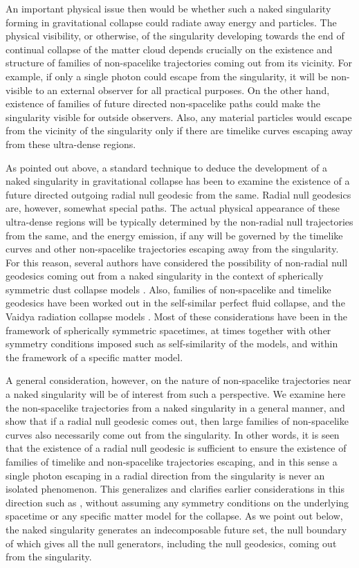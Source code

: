 \documentclass[twocolumn,aps,amsmath,amssymb,prl,showpacs,preprintnumbers]
{revtex4}
\begin{document}
An important physical issue then would be whether such a naked 
singularity forming in gravitational collapse could radiate away 
energy and particles. The physical visibility, or otherwise, of the 
singularity developing towards the end of continual collapse of the 
matter cloud depends crucially on the existence and structure of 
families of non-spacelike trajectories coming out from its vicinity. 
For example, if only a single photon could escape from the singularity, 
it will be non-visible to an external observer for all practical 
purposes. On the other hand, existence of families of future directed 
non-spacelike paths could make the singularity visible for outside 
observers. Also, any material particles would escape from the 
vicinity of the singularity only if there are timelike curves 
escaping away from these ultra-dense regions.



As pointed out above, a standard technique to deduce the 
development of a naked singularity in gravitational collapse has 
been to examine the existence of a future directed outgoing radial 
null geodesic from the same. Radial null geodesics are, however, 
somewhat special paths. The actual physical appearance of these 
ultra-dense regions will be typically determined by the non-radial null 
trajectories from the same, and the energy emission, if any will be governed 
by the timelike curves and other non-spacelike trajectories escaping 
away from the singularity. For this reason, several authors have 
considered the possibility of non-radial null geodesics coming out from 
a naked singularity in the context of spherically symmetric dust 
collapse models
\cite{dust}. 
Also, families of non-spacelike and timelike geodesics have been 
worked out in the self-similar perfect fluid collapse,
and the Vaidya radiation collapse models
\cite{JD}.
Most of these considerations have been in the framework of spherically 
symmetric spacetimes, at times together with other symmetry conditions imposed 
such as self-similarity of the models, and within the framework of a 
specific matter model. 


A general consideration, however, on the nature of non-spacelike 
trajectories near a naked singularity will be of interest from such 
a perspective. We examine here the non-spacelike trajectories from a 
naked singularity in a general manner, and show that if a radial null 
geodesic comes out, then large families of non-spacelike curves 
also necessarily come out from the singularity. In other words, it 
is seen that the existence of a radial null geodesic is sufficient to 
ensure the existence of families of timelike and non-spacelike trajectories 
escaping, and in this sense a single photon escaping in a radial 
direction from the singularity is never an isolated phenomenon. This 
generalizes and clarifies earlier considerations in this direction
such as 
\cite{dust}, 
without assuming any symmetry conditions on the underlying spacetime 
or any specific matter model for the collapse. As we point out below,
the naked singularity generates an indecomposable future set, the
null boundary of which gives all the null generators, including the
null geodesics, coming out from the singularity.
\end{document}
